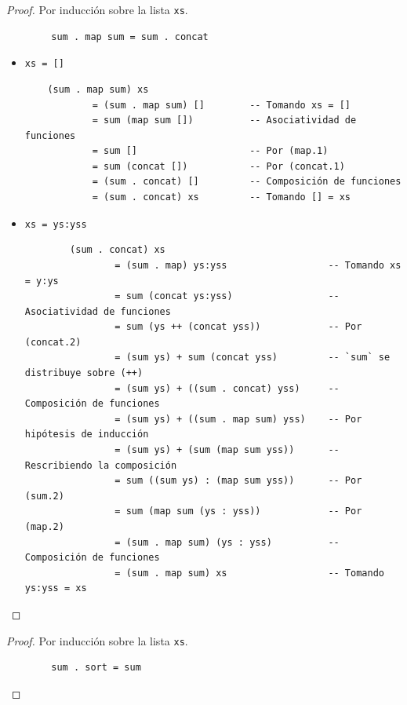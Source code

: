 \documentclass[11pt,letterpaper]{article}
\begin{document}
\begin{enumerate}

\begin{proof} Por inducción sobre la lista \texttt{xs}.
    \hfill
    \begin{verbatim}
        sum . map sum = sum . concat
    \end{verbatim}
    
    \begin{itemize}
    \item \texttt{xs = []}
    
    \begin{verbatim}
    (sum . map sum) xs
            = (sum . map sum) []        -- Tomando xs = []
            = sum (map sum [])          -- Asociatividad de funciones
            = sum []                    -- Por (map.1)
            = sum (concat [])           -- Por (concat.1)
            = (sum . concat) []         -- Composición de funciones
            = (sum . concat) xs         -- Tomando [] = xs
    \end{verbatim}
    
    \item \texttt{xs = ys:yss}
    \begin{verbatim}
        (sum . concat) xs
                = (sum . map) ys:yss                  -- Tomando xs = y:ys
                = sum (concat ys:yss)                 -- Asociatividad de funciones
                = sum (ys ++ (concat yss))            -- Por (concat.2)
                = (sum ys) + sum (concat yss)         -- `sum` se distribuye sobre (++)
                = (sum ys) + ((sum . concat) yss)     -- Composición de funciones
                = (sum ys) + ((sum . map sum) yss)    -- Por hipótesis de inducción
                = (sum ys) + (sum (map sum yss))      -- Rescribiendo la composición
                = sum ((sum ys) : (map sum yss))      -- Por (sum.2)
                = sum (map sum (ys : yss))            -- Por (map.2)
                = (sum . map sum) (ys : yss)          -- Composición de funciones
                = (sum . map sum) xs                  -- Tomando ys:yss = xs
    \end{verbatim}
    \end{itemize}
\end{proof}


\begin{proof} Por inducción sobre la lista \texttt{xs}.
    \hfill
    \begin{verbatim}
        sum . sort = sum
    \end{verbatim}
    

\end{proof}
\end{enumerate}
\end{document}
